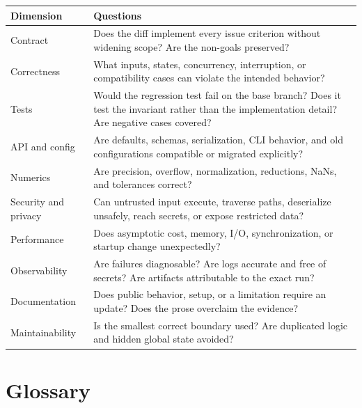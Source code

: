 \documentclass[11pt]{article}
\begin{document}
\begin{center}
\begin{tabularx}{\textwidth}{@{}l Y@{}}
\toprule
\textbf{Dimension} & \textbf{Questions} \\
\midrule
Contract & Does the diff implement every issue criterion without widening scope? Are the
  non-goals preserved? \\
Correctness & What inputs, states, concurrency, interruption, or compatibility cases can
  violate the intended behavior? \\
Tests & Would the regression test fail on the base branch? Does it test the invariant rather
  than the implementation detail? Are negative cases covered? \\
API and config & Are defaults, schemas, serialization, CLI behavior, and old configurations
  compatible or migrated explicitly? \\
Numerics & Are precision, overflow, normalization, reductions, NaNs, and tolerances correct? \\
Security and privacy & Can untrusted input execute, traverse paths, deserialize unsafely,
  reach secrets, or expose restricted data? \\
Performance & Does asymptotic cost, memory, I/O, synchronization, or startup change
  unexpectedly? \\
Observability & Are failures diagnosable? Are logs accurate and free of secrets? Are artifacts
  attributable to the exact run? \\
Documentation & Does public behavior, setup, or a limitation require an update? Does the prose
  overclaim the evidence? \\
Maintainability & Is the smallest correct boundary used? Are duplicated logic and hidden
  global state avoided? \\
\bottomrule
\end{tabularx}
\end{center}

\section{Glossary}
\end{document}
